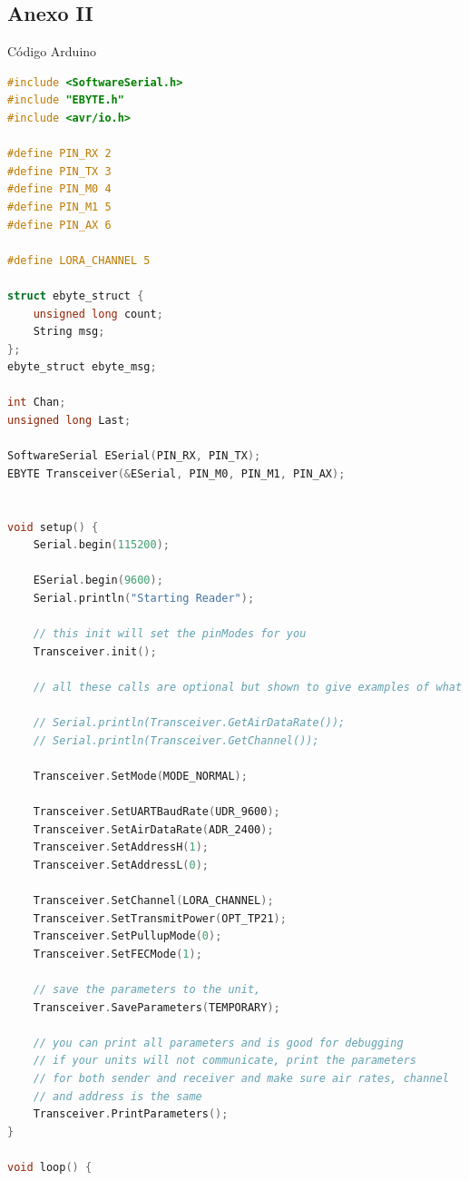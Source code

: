 \documentclass[12pt]{article}
\begin{document}
	\pagebreak
	
	\subsection*{Anexo II}
	
	\noindent Código Arduino \\
	
	\begin{lstlisting}[language=C]
#include <SoftwareSerial.h>
#include "EBYTE.h"
#include <avr/io.h>

#define PIN_RX 2
#define PIN_TX 3
#define PIN_M0 4
#define PIN_M1 5
#define PIN_AX 6

#define LORA_CHANNEL 5

struct ebyte_struct {
	unsigned long count;
	String msg;                                           
};
ebyte_struct ebyte_msg;

int Chan;
unsigned long Last;

SoftwareSerial ESerial(PIN_RX, PIN_TX);
EBYTE Transceiver(&ESerial, PIN_M0, PIN_M1, PIN_AX);


void setup() {
	Serial.begin(115200);
	
	ESerial.begin(9600);
	Serial.println("Starting Reader");
	
	// this init will set the pinModes for you
	Transceiver.init();
	
	// all these calls are optional but shown to give examples of what you can do
	
	// Serial.println(Transceiver.GetAirDataRate());
	// Serial.println(Transceiver.GetChannel());
	
	Transceiver.SetMode(MODE_NORMAL);
	
	Transceiver.SetUARTBaudRate(UDR_9600);
	Transceiver.SetAirDataRate(ADR_2400);
	Transceiver.SetAddressH(1);
	Transceiver.SetAddressL(0);
	
	Transceiver.SetChannel(LORA_CHANNEL);
	Transceiver.SetTransmitPower(OPT_TP21);
	Transceiver.SetPullupMode(0);
	Transceiver.SetFECMode(1);
	
	// save the parameters to the unit,
	Transceiver.SaveParameters(TEMPORARY);
	
	// you can print all parameters and is good for debugging
	// if your units will not communicate, print the parameters
	// for both sender and receiver and make sure air rates, channel
	// and address is the same
	Transceiver.PrintParameters();
}

void loop() {
	

\end{lstlisting}
\end{document}

